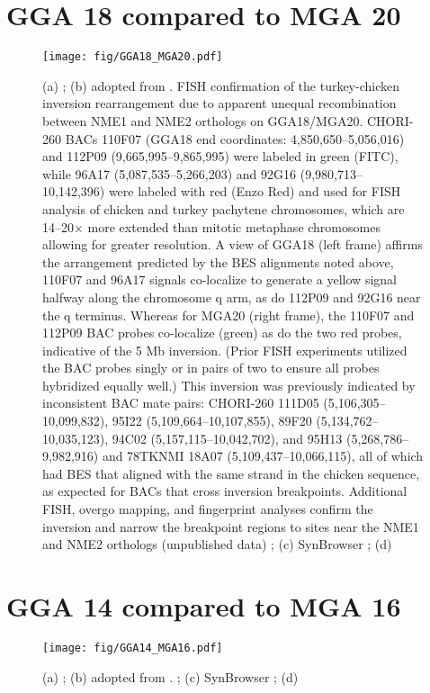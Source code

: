\documentclass[a4paper,9pt]{extarticle}
\begin{document}
\section{GGA 18 compared to MGA 20}
\begin{figure}[!h]
  \centering
  \texttt{[image: fig/GGA18\_MGA20.pdf]}
  \caption{
  (a)
  ;
  (b)
  adopted from \cite{}.
  FISH confirmation of the turkey-chicken inversion rearrangement due to apparent unequal recombination between NME1 and NME2 orthologs on GGA18/MGA20. CHORI-260 BACs 110F07 (GGA18 end coordinates: 4,850,650–5,056,016) and 112P09 (9,665,995–9,865,995) were labeled in green (FITC), while 96A17 (5,087,535–5,266,203) and 92G16 (9,980,713–10,142,396) were labeled with red (Enzo Red) and used for FISH analysis of chicken and turkey pachytene chromosomes, which are 14–20× more extended than mitotic metaphase chromosomes allowing for greater resolution. A view of GGA18 (left frame) affirms the arrangement predicted by the BES alignments noted above, 110F07 and 96A17 signals co-localize to generate a yellow signal halfway along the chromosome q arm, as do 112P09 and 92G16 near the q terminus. Whereas for MGA20 (right frame), the 110F07 and 112P09 BAC probes co-localize (green) as do the two red probes, indicative of the 5 Mb inversion. (Prior FISH experiments utilized the BAC probes singly or in pairs of two to ensure all probes hybridized equally well.) This inversion was previously indicated by inconsistent BAC mate pairs: CHORI-260 111D05 (5,106,305–10,099,832), 95I22 (5,109,664–10,107,855), 89F20 (5,134,762–10,035,123), 94C02 (5,157,115–10,042,702), and 95H13 (5,268,786–9,982,916) and 78TKNMI 18A07 (5,109,437–10,066,115), all of which had BES that aligned with the same strand in the chicken sequence, as expected for BACs that cross inversion breakpoints. Additional FISH, overgo mapping, and fingerprint analyses confirm the inversion and narrow the breakpoint regions to sites near the NME1 and NME2 orthologs (unpublished data)
  ;
  (c)
  SynBrowser
  ;
  (d)
  }
\end{figure}

\clearpage
\section{GGA 14 compared to MGA 16}
\begin{figure}[!h]
  \centering
  \texttt{[image: fig/GGA14\_MGA16.pdf]}
  \caption{
  (a)
  ;
  (b)
  adopted from \cite{}.
  ;
  (c)
  SynBrowser
  ;
  (d)
  }
\end{figure}
\end{document}
